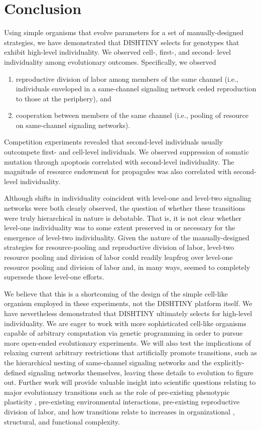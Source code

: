 \section{Conclusion}

Using simple organisms that evolve parameters for a set of manually-designed strategies, we have demonstrated that DISHTINY selects for genotypes that exhibit high-level individuality.
We observed cell-, first-, and second- level individuality among evolutionary outcomes.
Specifically, we observed
\begin{enumerate}
  \item reproductive division of labor among members of the same channel (i.e., individuals enveloped in a same-channel signaling network ceded reproduction to those at the periphery), and
  \item cooperation between members of the same channel (i.e., pooling of resource on same-channel signaling networks).
\end{enumerate}

Competition experiments revealed that second-level individuals usually outcompete first- and cell-level individuals.
We observed suppression of somatic mutation through apoptosis correlated with second-level individuality.
The magnitude of resource endowment for propagules was also correlated with second-level individuality.

Although shifts in individuality coincident with level-one and level-two signaling networks were both clearly observed, the question of whether these transitions were truly hierarchical in nature is debatable.
That is, it is not clear whether level-one individuality was to some extent preserved in or necessary for the emergence of level-two individuality.
Given the nature of the manually-designed strategies for resource-pooling and reproductive division of labor, level-two resource pooling and division of labor could readily leapfrog over level-one resource pooling and division of labor and, in many ways, seemed to completely supersede those level-one efforts.

We believe that this is a shortcoming of the design of the simple cell-like organism employed in these experiments, not the DISHTINY platform itself.
We have nevertheless demonstrated that DISHTINY ultimately selects for high-level individuality.
We are eager to work with more sophisticated cell-like organisms capable of arbitrary computation via genetic programming in order to pursue more open-ended evolutionary experiments. %
We will also test the implications of relaxing current arbitrary restrictions that artificially promote transitions, such as the hierarchical nesting of same-channel signaling networks and the explicitly-defined signaling networks themselves, leaving these details to evolution to figure out.
Further work will provide valuable insight into scientific questions relating to major evolutionary transitions such as the role of pre-existing phenotypic plasticity \citep{clune2007investigating, lalejini2016evolutionary}, pre-existing environmental interactions, pre-existing reproductive division of labor, and how transitions relate to increases in organizational \citep{goldsby2012task}, structural, and functional \citep{goldsby2014evolutionary} complexity.

